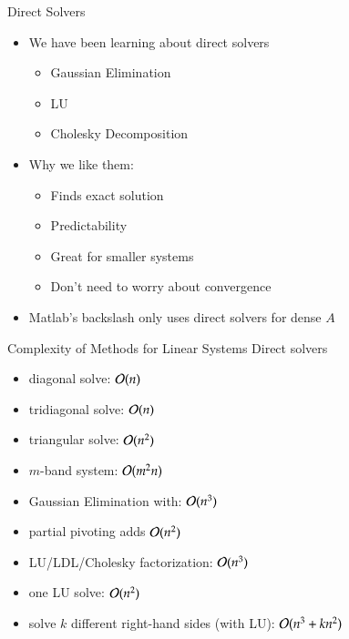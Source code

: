 \documentclass[10pt]{beamer}
\begin{document}
\begin{frame}{Direct Solvers}
\begin{itemize}

    \bigskip
    \item We have been learning about direct solvers 
        \begin{itemize}
            \item Gaussian Elimination
            \item LU
            \item Cholesky Decomposition 
        \end{itemize}


    \bigskip 

    \item Why we like them: 
        \begin{itemize}
            \item Finds exact solution 
            \item Predictability 
            \item Great for smaller systems
            \item Don't need to worry about convergence
        \end{itemize}
    \bigskip 

    \item Matlab's backslash only uses direct solvers for dense $A$

\end{itemize}


\end{frame}
\begin{frame}{Complexity of Methods for Linear Systems}
Direct solvers

\begin{itemize}
\item diagonal solve: ${\mathcal{O}}(n)$
\item tridiagonal solve: ${\mathcal{O}}(n)$
\item triangular solve: ${\mathcal{O}}(n^{2})$
\item $m$-band system: ${\mathcal{O}}(m^{2}n)$
\vspace{3mm}

\item Gaussian Elimination with: ${\mathcal{O}}(n^{3})$
\item partial pivoting adds ${\mathcal{O}}(n^{2})$

\vspace{3mm}
\item LU/LDL/Cholesky factorization: ${\mathcal{O}}(n^{3})$
\item one LU solve: ${\mathcal{O}}(n^{2})$
\item solve $k$ different right-hand sides (with LU): ${\mathcal{O}}(n^3 + k n^{2})$

\end{itemize}
\end{frame}
\end{document}
